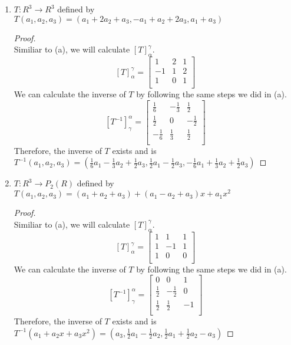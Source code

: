 \documentclass[11pt]{scrartcl}
\begin{document}
\begin{enumerate}[label=\alph*.]
	\item{
	$T:R^3 \rightarrow R^3$ defined by $T(a_1, a_2, a_3) =
	(a_1 + 2a_2 + a_3, -a_1 + a_2 + 2a_3, a_1 + a_3)$ 
	\begin{proof}
	\-\\
	Similiar to (a), we will calculate $[T]_{\alpha}^{\gamma}$.
	\[
	[T]_{\alpha}^{\gamma} = 
	\begin{bmatrix}
		1 & 2 & 1\\
		-1 & 1 & 2\\
		1 & 0 & 1 \\
	\end{bmatrix}
	\]
	We can calculate the inverse of $T$ by following the same steps we did in (a).
	\[
	[T^{-1}]_{\gamma}^{\alpha} = 
	\begin{bmatrix}
		\frac16 & -\frac13 & \frac12\\
		\frac12 & 0 & -\frac12\\
		-\frac16 & \frac13 & \frac12 \\
	\end{bmatrix}
	\]
	Therefore, the inverse of $T$ exists and is \\$T^{-1}(a_1, a_2, a_3) 
	=(\frac16a_1 -\frac13a_2 + \frac12a_3,\frac12a_1 -\frac12a_3,
	-\frac16a_1 + \frac13a_2 + \frac12a_3)$
	\end{proof}
	}

	\item{
		$T:R^3 \rightarrow P_2(R)$ defined by $T(a_1, a_2, a_3) =
		(a_1 + a_2 + a_3) + (a_1 - a_2 + a_3)x + a_1x^2$ 
		\begin{proof}
		\-\\
		Similiar to (a), we will calculate $[T]_{\alpha}^{\gamma}$.
		\[
		[T]_{\alpha}^{\gamma} = 
		\begin{bmatrix}
			1 & 1 & 1\\
			1 & -1 & 1\\
			1 & 0 & 0 \\
		\end{bmatrix}
		\]
		We can calculate the inverse of $T$ by following the same steps we did in (a).
		\[
		[T^{-1}]_{\gamma}^{\alpha} = 
		\begin{bmatrix}
			0 & 0 & 1\\
			\frac12 & -\frac12 & 0\\
			\frac12 & \frac12 & -1\\
		\end{bmatrix}
		\]
		Therefore, the inverse of $T$ exists and is \\$T^{-1}(a_1 + a_2x + a_3x^2) 
		=(a_3, \frac12a_1 - \frac12a_2, \frac12a_1 + \frac12a_2 -a_3)$
		\end{proof}
	
}
\end{enumerate}
\end{document}
